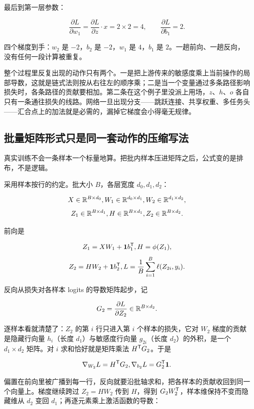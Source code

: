 最后到第一层参数：

\[
\frac{\partial L}{\partial w_1}
=\frac{\partial L}{\partial z}\cdot x
=2\times 2=4,\qquad
\frac{\partial L}{\partial b_1}=2 .
\]

四个梯度到手：\(w_2\) 是 \(-2\)，\(b_2\) 是 \(-2\)，\(w_1\) 是 \(4\)，\(b_1\) 是 \(2\)。一趟前向、一趟反向，没有任何一段计算被重复。

整个过程里反复出现的动作只有两个。一是把上游传来的敏感度乘上当前操作的局部导数，这就是链式法则按从右往左的顺序乘；二是当一个变量通过多条路径影响损失时，各条路径的贡献要相加。第二条在这个例子里没派上用场，\(z\)、\(h\)、\(o\) 各自只有一条通往损失的线路。网络一旦出现分支——跳跃连接、共享权重、多任务头——汇合点上的加法就是必需的，漏掉它梯度会小得毫无规律。

\subsection{批量矩阵形式只是同一套动作的压缩写法}

真实训练不会一条样本一个标量地算。把批内样本压进矩阵之后，公式变的是排布，不是逻辑。

采用样本按行的约定。批大小 \(B\)，各层宽度 \(d_0,d_1,d_2\)：

\[
X\in\mathbb{R}^{B\times d_0},\space
W_1\in\mathbb{R}^{d_0\times d_1},\space
W_2\in\mathbb{R}^{d_1\times d_2},
\]
\[
Z_1\in\mathbb{R}^{B\times d_1},\space
H\in\mathbb{R}^{B\times d_1},\space
Z_2\in\mathbb{R}^{B\times d_2}.
\]

前向是

\[
Z_1=XW_1+\mathbf1b_1^{\mathsf{T}},
\space H=\phi(Z_1),
\]
\[
Z_2=HW_2+\mathbf1b_2^{\mathsf{T}},
\space
L=\frac1B\sum_{i=1}^B\ell(Z_{2i},y_i).
\]

反向从损失对各样本 logits 的导数矩阵起步，记

\[
G_2=\frac{\partial L}{\partial Z_2}\in\mathbb{R}^{B\times d_2}.
\]

逐样本看就清楚了：\(Z_2\) 的第 \(i\) 行只进入第 \(i\) 个样本的损失，它对 \(W_2\) 梯度的贡献是隐藏行向量 \(h_i\)（长度 \(d_1\)）与敏感度行向量 \(g_{2i}\)（长度 \(d_2\)）的外积，是一个 \(d_1\times d_2\) 矩阵。对 \(i\) 求和恰好就是矩阵乘法 \(H^{\mathsf{T}}G_2\)。于是

\[
\nabla_{W_2}L=H^{\mathsf{T}} G_2,\space
\nabla_{b_2}L=G_2^{\mathsf{T}}\mathbf1 .
\]

偏置在前向里被广播到每一行，反向就要沿批轴求和，把各样本的贡献收回到同一个向量上。梯度继续跨过 \(Z_2=HW_2\) 传到 \(H\)，得到 \(G_2W_2^{\mathsf{T}}\)，样本维保持不变而隐藏维从 \(d_2\) 变回 \(d_1\)；再逐元素乘上激活函数的导数：

